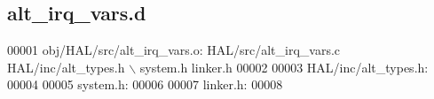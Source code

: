 \subsection{alt\+\_\+irq\+\_\+vars.\+d}
\label{alt__irq__vars_8d_source}

\begin{DoxyCode}
00001 obj/HAL/src/alt\_irq\_vars.o: HAL/src/alt\_irq\_vars.c HAL/inc/alt\_types.h \(\backslash\)
 system.h linker.h
00002 
00003 HAL/inc/alt\_types.h:
00004 
00005 system.h:
00006 
00007 linker.h:
00008 \end{DoxyCode}
